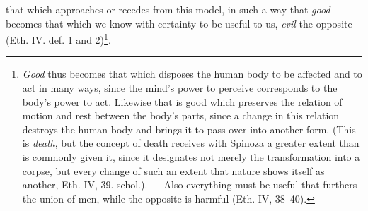\documentclass[12pt,a4paper,openany]{book}
\begin{document}
that which approaches or recedes from this model, in
such a way that \emph{good} becomes that which we know with certainty to be
useful to us, \emph{evil} the opposite (Eth. IV. def. 1 and 2)\footnote{\emph{Good}
thus becomes that which disposes the human body
to be affected and to act in many ways, since the mind's power to
perceive corresponds to the body's power to act. Likewise
that is good which preserves the relation of motion and rest between the body's
parts, since a change in this relation destroys the human
body and brings it to pass over into another form. (This
is \emph{death}, but the concept of death receives with Spinoza a greater
extent than is commonly given it, since it designates not merely
the transformation into a corpse, but every change of such an
extent that nature shows itself as another, Eth. IV, 39. schol.). --- Also everything must be useful that furthers the union of men,
while the opposite is harmful (Eth. IV, 38--40).}.
\end{document}
